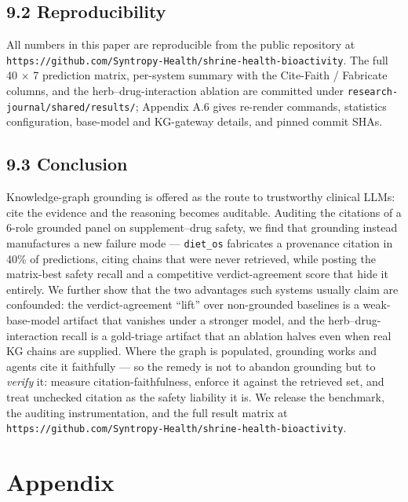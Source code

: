 \documentclass[
]{article}
\begin{document}
\hypertarget{reproducibility}{%
\subsection{9.2 Reproducibility}\label{reproducibility}}

All numbers in this paper are reproducible from the public repository at
\texttt{https://github.com/Syntropy-Health/shrine-health-bioactivity}. The
full 40 × 7 prediction matrix, per-system summary with the Cite-Faith /
Fabricate columns, and the herb--drug-interaction ablation are committed
under \texttt{research-journal/shared/results/}; Appendix A.6 gives
re-render commands, statistics configuration, base-model and KG-gateway
details, and pinned commit SHAs.

\hypertarget{conclusion}{%
\subsection{9.3 Conclusion}\label{conclusion}}

Knowledge-graph grounding is offered as the route to trustworthy
clinical LLMs: cite the evidence and the reasoning becomes auditable.
Auditing the citations of a 6-role grounded panel on supplement--drug
safety, we find that grounding instead manufactures a new failure mode
--- \texttt{diet\_os} fabricates a provenance citation in 40\% of
predictions, citing chains that were never retrieved, while posting the
matrix-best safety recall and a competitive verdict-agreement score that
hide it entirely. We further show that the two advantages such systems
usually claim are confounded: the verdict-agreement ``lift'' over
non-grounded baselines is a weak-base-model artifact that vanishes under
a stronger model, and the herb--drug-interaction recall is a gold-triage
artifact that an ablation halves even when real KG chains are supplied.
Where the graph is populated, grounding works and agents cite it
faithfully --- so the remedy is not to abandon grounding but to
\emph{verify} it: measure citation-faithfulness, enforce it against the
retrieved set, and treat unchecked citation as the safety liability it
is. We release the benchmark, the auditing instrumentation, and the full
result matrix at
\texttt{https://github.com/Syntropy-Health/shrine-health-bioactivity}.



\appendix

\hypertarget{appendix}{%
\section{Appendix}\label{appendix}}
\end{document}
